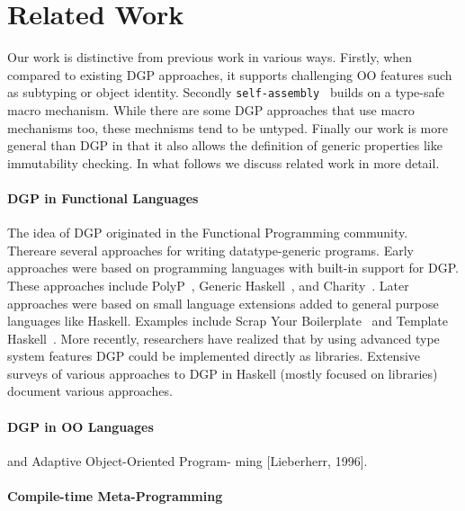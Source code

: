 \documentclass[preprint]{sigplanconf}
\newcommand{\selfassembly}{\texttt{self-assembly~}}
\begin{document}

\section{Related Work}
\label{sec:related-work}

Our work is distinctive from previous work in various ways.  Firstly,
when compared to existing DGP approaches, it supports challenging OO
features such as subtyping or object identity.  Secondly \selfassembly
builds on a type-safe macro mechanism. While there are some DGP approaches
that use macro mechanisms too, these mechnisms tend to be untyped.
Finally our work is more general than DGP in that it also allows the
definition of generic properties like immutability checking.
In what follows we discuss related work in more detail.

\paragraph{DGP in Functional Languages} 
The idea of DGP originated in the Functional Programming community.
Thereare several approaches for writing datatype-generic
programs. Early approaches were based on programming languages with
built-in support for DGP. These approaches include PolyP~\cite{},
Generic Haskell~\cite{}, and Charity~\cite{}. Later approaches were
based on small language extensions added to general purpose languages
like Haskell. Examples include Scrap Your Boilerplate~\cite{} and
Template Haskell~\cite{}.  More recently, researchers have realized
that by using advanced type system features DGP could be implemented
directly as libraries. Extensive surveys of various approaches to DGP
in Haskell (mostly focused on libraries) document various approaches.

\paragraph{DGP in OO Languages}

and
Adaptive Object-Oriented Program- ming [Lieberherr, 1996].

\paragraph{Compile-time Meta-Programming}
\end{document}
